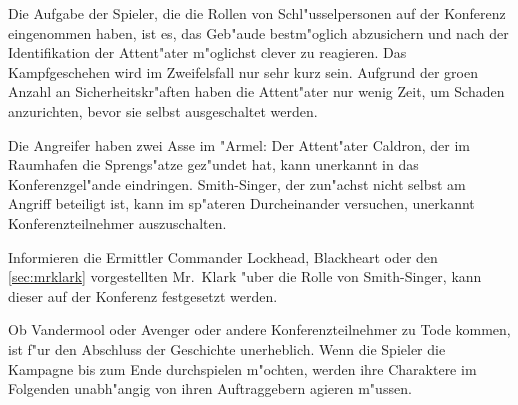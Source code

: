 \begin{remarks}	
	Die Aufgabe der Spieler, die die Rollen von Schl"usselpersonen auf der Konferenz eingenommen haben, ist es, das Geb"aude bestm"oglich abzusichern und nach der Identifikation der Attent"ater m"oglichst clever zu reagieren. Das Kampfgeschehen wird im Zweifelsfall nur sehr kurz sein. Aufgrund der gro\3en Anzahl an Sicherheitskr"aften haben die Attent"ater nur wenig Zeit, um Schaden anzurichten, bevor sie selbst ausgeschaltet werden. 
	
	Die Angreifer haben zwei Asse im "Armel: Der Attent"ater Caldron, der im Raumhafen die Sprengs"atze gez"undet hat, kann unerkannt in das Konferenzgel"ande eindringen. Smith-Singer, der zun"achst nicht selbst am Angriff beteiligt ist, kann im sp"ateren Durcheinander versuchen, unerkannt Konferenzteilnehmer auszuschalten.

	Informieren die Ermittler Commander Lockhead, Blackheart oder den \cref{sec:mrklark} vorgestellten Mr.~Klark "uber die Rolle von Smith-Singer, kann dieser auf der Konferenz festgesetzt werden.
	
	Ob Vandermool oder Avenger oder andere Konferenzteilnehmer zu Tode kommen, ist f"ur den Abschluss der Geschichte unerheblich. Wenn die Spieler die Kampagne bis zum Ende durchspielen m"ochten, werden ihre Charaktere im Folgenden unabh"angig von ihren Auftraggebern agieren m"ussen.
\end{remarks}
